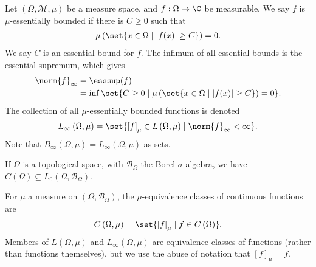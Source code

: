 \begin{definition}
  Let $\left(\Omega,\mathcal{M},\mu\right)$ be a measure space, and $f: \Omega\rightarrow \C$ be measurable. We say $f$ is $\mu$-essentially bounded if there is $C\geq 0$ such that
  \begin{align*}
    \mu\left(\set{x\in \Omega\mid \left\vert f(x) \right\vert\geq C}\right) = 0.
  \end{align*}
  We say $C$ is an essential bound for $f$. The infimum of all essential bounds is the essential supremum, which gives
  \begin{align*}
    \norm{f}_{\infty} &= \esssup(f)\\
                      &= \inf\set{C\geq 0 \mid \mu\left(\set{x\in \Omega\mid \left\vert f(x) \right\vert\geq C}\right) = 0}.
  \end{align*}
  The collection of all $\mu$-essentially bounded functions is denoted
  \begin{align*}
    L_{\infty}\left(\Omega,\mu\right) = \set{\left[f\right]_{\mu}\in L\left(\Omega,\mu\right)\mid \norm{f}_{\infty} < \infty}.
  \end{align*}
  Note that $B_{\infty}\left(\Omega,\mu\right) = L_{\infty}\left(\Omega,\mu\right)$ as sets.\newline

  If $\Omega$ is a topological space, with $\mathcal{B}_{\Omega}$ the Borel $\sigma$-algebra, we have $C\left(\Omega\right)\subseteq L_{0}\left(\Omega,\mathcal{B}_{\Omega}\right)$.\newline

  For $\mu$ a measure on $\left(\Omega,\mathcal{B}_{\Omega}\right)$, the $\mu$-equivalence classes of continuous functions are
  \begin{align*}
    C\left(\Omega,\mu\right) = \set{\left[f\right]_{\mu}\mid f\in C\left(\Omega\right)}.
  \end{align*}
  Members of $L\left(\Omega,\mu\right)$ and $L_{\infty}\left(\Omega,\mu\right)$ are equivalence classes of functions (rather than functions themselves), but we use the abuse of notation that $\left[f\right]_{\mu} = f$.
\end{definition}
